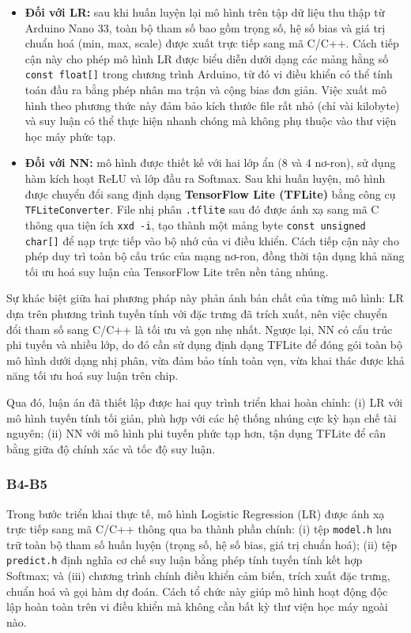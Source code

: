 \begin{itemize}
    \item \textbf{Đối với LR:} sau khi huấn luyện lại mô hình trên tập dữ liệu thu thập từ Arduino Nano 33, 
    toàn bộ tham số bao gồm trọng số, hệ số bias và giá trị chuẩn hoá (min, max, scale) 
    được xuất trực tiếp sang mã C/C++. Cách tiếp cận này cho phép mô hình LR 
    được biểu diễn dưới dạng các mảng hằng số \texttt{const float[]} trong chương trình Arduino, 
    từ đó vi điều khiển có thể tính toán đầu ra bằng phép nhân ma trận và cộng bias đơn giản. 
    Việc xuất mô hình theo phương thức này đảm bảo kích thước file rất nhỏ (chỉ vài kilobyte) 
    và suy luận có thể thực hiện nhanh chóng mà không phụ thuộc vào thư viện học máy phức tạp.  

    \item \textbf{Đối với NN:} mô hình được thiết kế với hai lớp ẩn (8 và 4 nơ-ron), 
    sử dụng hàm kích hoạt ReLU và lớp đầu ra Softmax. Sau khi huấn luyện, 
    mô hình được chuyển đổi sang định dạng \textbf{TensorFlow Lite (TFLite)} bằng công cụ \texttt{TFLiteConverter}. 
    File nhị phân \texttt{.tflite} sau đó được ánh xạ sang mã C thông qua tiện ích \texttt{xxd -i}, 
    tạo thành một mảng byte \texttt{const unsigned char[]} để nạp trực tiếp vào bộ nhớ của vi điều khiển. 
    Cách tiếp cận này cho phép duy trì toàn bộ cấu trúc của mạng nơ-ron, 
    đồng thời tận dụng khả năng tối ưu hoá suy luận của TensorFlow Lite trên nền tảng nhúng.  
\end{itemize}

Sự khác biệt giữa hai phương pháp này phản ánh bản chất của từng mô hình: 
LR dựa trên phương trình tuyến tính với đặc trưng đã trích xuất, 
nên việc chuyển đổi tham số sang C/C++ là tối ưu và gọn nhẹ nhất. 
Ngược lại, NN có cấu trúc phi tuyến và nhiều lớp, do đó cần sử dụng định dạng TFLite 
để đóng gói toàn bộ mô hình dưới dạng nhị phân, vừa đảm bảo tính toàn vẹn, 
vừa khai thác được khả năng tối ưu hoá suy luận trên chip.  

Qua đó, luận án đã thiết lập được hai quy trình triển khai hoàn chỉnh:  
(i) LR với mô hình tuyến tính tối giản, phù hợp với các hệ thống nhúng cực kỳ hạn chế tài nguyên;  
(ii) NN với mô hình phi tuyến phức tạp hơn, tận dụng TFLite để cân bằng giữa độ chính xác và tốc độ suy luận.  

\subsubsection{B4-B5}
Trong bước triển khai thực tế, mô hình Logistic Regression (LR) được ánh xạ trực tiếp sang mã C/C++ 
thông qua ba thành phần chính: (i) tệp \texttt{model.h} lưu trữ toàn bộ tham số huấn luyện (trọng số, hệ số bias, 
giá trị chuẩn hoá); (ii) tệp \texttt{predict.h} định nghĩa cơ chế suy luận bằng phép tính tuyến tính kết hợp Softmax; 
và (iii) chương trình chính điều khiển cảm biến, trích xuất đặc trưng, chuẩn hoá và gọi hàm dự đoán. 
Cách tổ chức này giúp mô hình hoạt động độc lập hoàn toàn trên vi điều khiển mà không cần bất kỳ thư viện học máy ngoài nào.  

